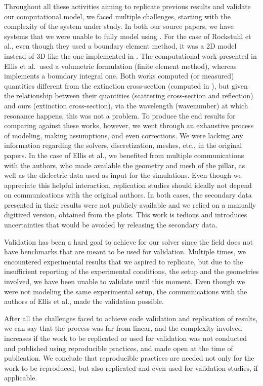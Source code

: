 
Throughout all these activities aiming to replicate previous results and validate our computational model, we faced multiple challenges, starting with the complexity of the system under study. In both our source papers, we have systems that we were unable to fully 
model using \pygbe. For the case of Rockstuhl et al., even though they used a boundary element method, it was a 2D model instead of 3D like the one implemented in \pygbe. The computational work presented in Ellis et al.\ used a volumetric 
formulation (finite element method), whereas \pygbe implements a boundary integral one. Both works computed (or measured) quantities different from the extinction cross-section (computed in \pygbe), but given the relationship between their quantities (scattering cross-section and reflection)  
and ours (extinction cross-section), via the wavelength (wavenumber) at which resonance happens, this was not a problem. To produce the end results for comparing against these works, however, we went through an 
exhaustive process of modeling, making assumptions, and even corrections. We were lacking any information regarding the solvers, discretization, meshes, etc., in the original papers. In the case of Ellis et al., we benefited from multiple communications with the authors, 
who made available the geometry and mesh of the pillar, as well as the dielectric data used as input for the simulations. Even though we appreciate this helpful interaction, replication studies should ideally not depend on communications with the original authors. 
In both cases, the secondary data presented in their results were not publicly available and we relied on a manually digitized version, obtained from the plots. This work is tedious and introduces uncertainties that would be avoided by releasing 
the secondary data.

Validation has been a hard goal to achieve for our solver since the field does not have benchmarks that are meant to be used for validation. Multiple times,
we encountered experimental results that we aspired to replicate, but due to the insufficient reporting of the experimental conditions, the setup and the geometries involved, 
we have been unable to validate until this moment. Even though we were not modeling the same experimental setup, the communications with the authors of Ellis et al., made 
the validation possible.

After all the challenges faced to achieve code validation and replication of results, we can say that the process was far from  linear, 
and the complexity involved increases if the work to be replicated or used for validation was not conducted and published using reproducible practices, and made open at the time 
of publication. We conclude that reproducible practices are needed not only for the work to be reproduced, but also 
replicated and even used for validation studies, if applicable.
